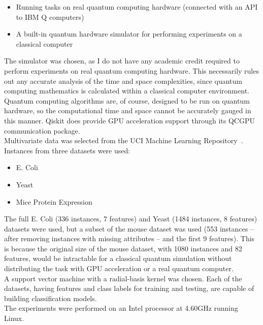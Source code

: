 \documentclass{article}
\begin{document}
    \begin{itemize}
      \item{Running tasks on real quantum computing hardware (connected with an API to IBM Q computers)}
      \item{A built-in quantum hardware simulator for performing experiments on a classical computer}
    \end{itemize}

  The simulator was chosen, as I do not have any academic credit required to perform experiments on real quantum computing hardware. This necessarily rules out any accurate analysis of the time and space complexities, since quantum computing mathematics is calculated within a classical computer environment. Quantum computing algorithms are, of course, designed to be run on quantum hardware, so the computational time and space cannot be accurately gauged in this manner. Qiskit does provide GPU acceleration support through its QCGPU communication package.~\cite{qcgpu} \\

  Multivariate data was selected from the UCI Machine Learning Repository~\cite{mlrepo}. Instances from three datasets were used:

    \begin{itemize}
      \item E. Coli~\cite{ecoli}
      \item Yeast~\cite{yeast}
      \item Mice Protein Expression~\cite{mouse}
    \end{itemize}

  The full E. Coli (336 instances, 7 features) and Yeast (1484 instances, 8 features) datasets were used, but a subset of the mouse dataset was used (553 instances -- after removing instances with missing attributes -- and the first 9 features). This is because the original size of the mouse dataset, with 1080 instances and 82 features, would be intractable for a classical quantum simulation without distributing the task with GPU acceleration or a real quantum computer. \\

  A support vector machine with a radial-basis kernel was chosen. Each of the datasets, having features and class labels for training and testing, are capable of building classification models. \\

  The experiments were performed on an Intel processor at 4.60GHz running Linux.
\end{document}
